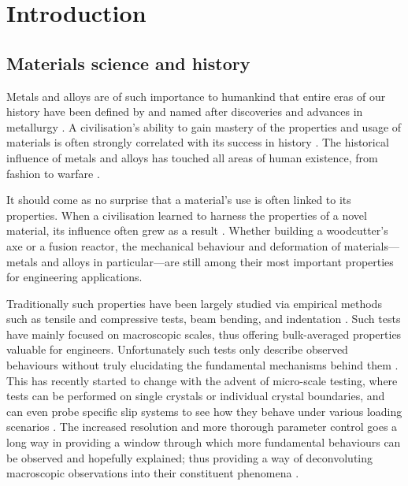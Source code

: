 \chapter{Introduction}
\label{c:intro}
\section{Materials science and history}
\label{s:matsci_history}
Metals and alloys are of such importance to humankind that entire eras of our history have been defined by and named after discoveries and advances in metallurgy \cite{metals_prehistory1, metals_prehistory2}. A civilisation's ability to gain mastery of the properties and usage of materials is often strongly correlated with its success in history \cite{metals_success1}. The historical influence of metals and alloys has touched all areas of human existence, from fashion to warfare \cite{metals_social}.

It should come as no surprise that a material's use is often linked to its properties. When a civilisation learned to harness the properties of a novel material, its influence often grew as a result \cite{guns_germs_steel, metals_success2}. Whether building a woodcutter's axe or a fusion reactor, the mechanical behaviour and deformation of materials---metals and alloys in particular---are still among their most important properties for engineering applications.

Traditionally such properties have been largely studied via empirical methods such as tensile and compressive tests, beam bending, and indentation \cite{tensile_test_theory, bending_test_theory, indentation_theory}. Such tests have mainly focused on macroscopic scales, thus offering bulk-averaged properties valuable for engineers. Unfortunately such tests only describe observed behaviours without truly elucidating the fundamental mechanisms behind them \cite{micromech_test1}. This has recently started to change with the advent of micro-scale testing, where tests can be performed on single crystals or individual crystal boundaries, and can even probe specific slip systems to see how they behave under various loading scenarios \cite{micromech_test2, micromech_test3}. The increased resolution and more thorough parameter control goes a long way in providing a window through which more fundamental behaviours can be observed and hopefully explained; thus providing a way of deconvoluting macroscopic observations into their constituent phenomena \cite{micro_macro1, micro_macro2}.

